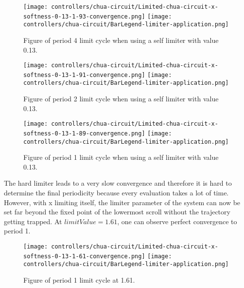\documentclass[main]{subfiles}
\begin{document}
\begin{figure}[H]
\centering
\texttt{[image: controllers/chua-circuit/Limited-chua-circuit-x-softness-0-13-1-93-convergence.png]}
\texttt{[image: controllers/chua-circuit/BarLegend-limiter-application.png]}
\caption[Figure of period 4 limit cycle using self limiting 0.13 soft limiter]{Figure of period 4 limit cycle when using a self limiter with value 0.13.}
\label{figure:x-0.13-4-limit-cycle-trajectory}
\end{figure}

\begin{figure}[H]
\centering
\texttt{[image: controllers/chua-circuit/Limited-chua-circuit-x-softness-0-13-1-91-convergence.png]}
\texttt{[image: controllers/chua-circuit/BarLegend-limiter-application.png]}
\caption[Figure of period 2 limit cycle using self limiting 0.13 soft limiter]{Figure of period 2 limit cycle when using a self limiter with value 0.13.}
\label{figure:x-0.13-2-limit-cycle-trajectory}
\end{figure}

\begin{figure}[H]
\centering
\texttt{[image: controllers/chua-circuit/Limited-chua-circuit-x-softness-0-13-1-89-convergence.png]}
\texttt{[image: controllers/chua-circuit/BarLegend-limiter-application.png]}
\caption[Figure of period 1 limit cycle using self limiting 0.13 soft limiter]{Figure of period 1 limit cycle when using a self limiter with value 0.13.}
\label{figure:x-0.13-1-limit-cycle-trajectory}
\end{figure}

The hard limiter leads to a very slow convergence and therefore it is hard to determine the final periodicity because every evaluation takes a lot of time. %
%
However, with x limiting itself, the limiter parameter of the system can now be set far beyond the fixed point of the lowermost scroll without the trajectory getting trapped. %
%
At \(limitValue=1.61\), one can observe perfect convergence to period 1.

\begin{figure}[H]
\centering
\texttt{[image: controllers/chua-circuit/Limited-chua-circuit-x-softness-0-13-1-61-convergence.png]}
\texttt{[image: controllers/chua-circuit/BarLegend-limiter-application.png]}
\caption[Figure of period 1 limit cycle]{Figure of period 1 limit cycle at 1.61.}
\label{figure:x-0.13-fast-1-limit-cycle-trajectory-1-61}
\end{figure}
\end{document}
